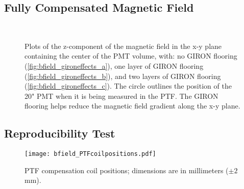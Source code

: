 \subsection{Fully Compensated Magnetic Field}
\label{Appendix:PlotsofFullCompensation}

%
\begin{figure}[htbp]
  \begin{center}
    \\
    \vspace{-3 mm}
  \caption{Plots of the z-component of the magnetic field in the x-y plane containing the center of the PMT volume, with: no GIRON flooring (\ref{fig:bfield_gironeffects_a}), one layer of GIRON flooring (\ref{fig:bfield_gironeffects_b}), and two layers of GIRON flooring (\ref{fig:bfield_gironeffects_c}). The circle outlines the position of the 20" PMT when it is being measured in the PTF. The GIRON flooring helps reduce the magnetic field gradient along the x-y plane.}
  \label{fig:bfield_gironeffects}
  \end{center}
\end{figure}
%

\subsection{Reproducibility Test}
\label{Appendix:ReproducibilityTest}

%
\begin{figure}[H]
  \begin{center}
  \texttt{[image: bfield\_PTFcoilpositions.pdf]}
  \caption{PTF compensation coil positions; dimensions are in millimeters ($\pm2$ mm).}
  \label{fig:coilpos}
  \end{center}
\end{figure}
%

